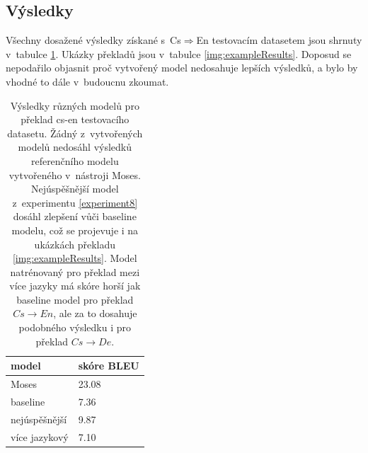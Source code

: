 \subsection{Výsledky}
Všechny dosažené výsledky získané s~Cs$\Rightarrow$En testovacím datasetem jsou shrnuty v~tabulce \ref{table:results}. Ukázky překladů jsou v~tabulce \ref{img:exampleResults}. Doposud se nepodařilo objasnit proč vytvořený model nedosahuje lepších výsledků, a bylo by vhodné to dále v~budoucnu zkoumat.

\begin{table}[H]
    \begin{center}
        \begin{tabular}{ll}
          \toprule
           model & skóre BLEU \\
          \midrule
           Moses & 23.08 \\
           baseline & 7.36 \\
           nejúspěšnější & 9.87 \\
           více jazykový & 7.10 \\
          \bottomrule
        \end{tabular}
    \end{center}
	\caption{Výsledky různých modelů pro překlad cs-en testovacího datasetu. Žádný z~vytvořených modelů nedosáhl výsledků referenčního modelu vytvořeného v~nástroji Moses. Nejúspěšnější model z~experimentu \ref{experiment8} dosáhl zlepšení vůči baseline modelu, což se projevuje i na ukázkách překladu \ref{img:exampleResults}. Model natrénovaný pro překlad mezi více jazyky má skóre horší jak baseline model pro překlad $Cs\rightarrow En$, ale za to dosahuje podobného výsledku i pro překlad $Cs\rightarrow De$.}
	\label{table:results}
\end{table}


